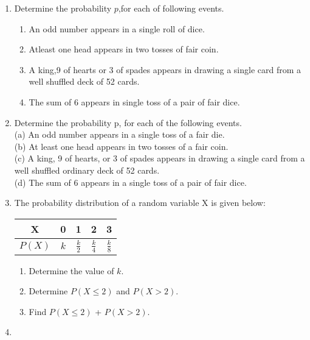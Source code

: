 \begin{enumerate}[label=\thesection.\arabic*,ref=\thesection.\theenumi]
\item Determine the probability $p$,for each of following events.
\begin{enumerate}
\item An odd number appears in a single roll of dice.
\item Atleast one head appears in two tosses of fair coin.
\item A king,9 of hearts or 3 of spades appears in drawing a single card from a well shuffled deck of 52 cards.
\item The sum of 6 appears in single toss of a pair of fair dice.
\end{enumerate}

\item Determine the probability p, for each of the following events.\\
(a) An odd number appears in a single toss of a fair die.\\
(b) At least one head appears in two tosses of a fair coin.\\
(c) A king, 9 of hearts, or 3 of spades appears in drawing a single card from a
well shuffled ordinary deck of 52 cards.\\
(d) The sum of 6 appears in a single toss of a pair of fair dice.

\item The probability distribution of a random variable X is given below:
\begin{table}[h]
    \centering
    \begin{tabular}{|c|c|c|c|c|}
        \hline
        X & 0 & 1 & 2 & 3 \\
        \hline
        $P(X)$ & $k$ & $\frac{k}{2}$ & $\frac{k}{4}$ & $\frac{k}{8}$ \\
        \hline
    \end{tabular}
\end{table}
\begin{enumerate}
    \item Determine the value of $k$.
    \item Determine $P(X \le 2)$ and $P(X > 2)$.
    \item Find $P(X \le 2)$ + $P(X > 2)$.
\end{enumerate}
\solution

\item 
\end{enumerate}
